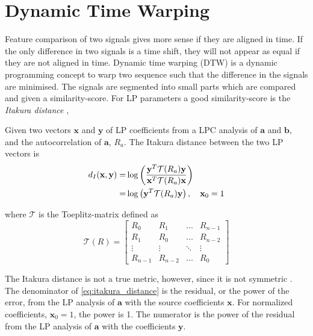 \section{Dynamic Time Warping} %
\label{sec:dynamic_time_warping}
\newcommand{\ttt}{\mathcal T}
\newcommand{\auto}{R}
\newcommand{\Auto}{\boldsymbol R}

Feature comparison of two signals gives more sense if they are aligned in time. If the only difference in two signals is a time shift, they will not appear as equal if they are not aligned in time. Dynamic time warping (DTW) is a dynamic programming concept to warp two sequence such that the difference in the signals are minimised. The signals are segmented into small parts which are compared and given a similarity-score. For LP parameters a good similarity-score is the \emph{Itakura distance} \cite{itakura90},
\newcommand{\ita}{d_{I}}
\begin{definition}
	Given two vectors $\mathbf{x}$ and $\mathbf{y}$ of LP coefficients from a LPC analysis of $\mathbf{a}$ and $\mathbf{b}$, and the autocorrelation of $\mathbf{a}$, $\auto_a$. The Itakura distance between the two LP vectors is
	\begin{equation}
		\label{eq:itakura_distance}
		\begin{split}
			\ita(\mathbf{x},\mathbf{y}) = & \log\pbrackets{\frac{\mathbf{y}^T \ttt(\auto_a) \mathbf{y}}{\mathbf{x}^T \ttt(\auto_a) \mathbf{x}}} \\
			 = & \log\pbrackets{\mathbf{y}^T \ttt(\auto_a) \mathbf{y}}, \quad \mathbf{x}_0 = 1
		\end{split}
	\end{equation}
\end{definition}
where $\ttt$ is the Toeplitz-matrix defined as 
\begin{equation}
	\label{eq:toeplitz}
	\ttt(\auto) = 
	\begin{bmatrix}
		\auto_0 & \auto_1 & \dots & \auto_{n-1} 	\\
		\auto_1 & \auto_0 & \dots & \auto_{n-2} \\
		\vdots & \vdots & \ddots & \vdots \\
		\auto_{n-1} & \auto_{n-2} & \dots & \auto_{0}
	\end{bmatrix}
\end{equation}	

The Itakura distance is not a true metric, however, since it is not symmetric \cite{kreyszig78}. The denominator of \eqref{eq:itakura_distance} is the residual, or the power of the error, from the LP analysis of $\mathbf{a}$ with the source coefficients $\mathbf{x}$. For normalized coefficients, $\mathbf{x}_0 = 1$, the power is 1. The numerator is the power of the residual from the LP analysis of $\mathbf{a}$ with the coefficients $\mathbf{y}$. 

